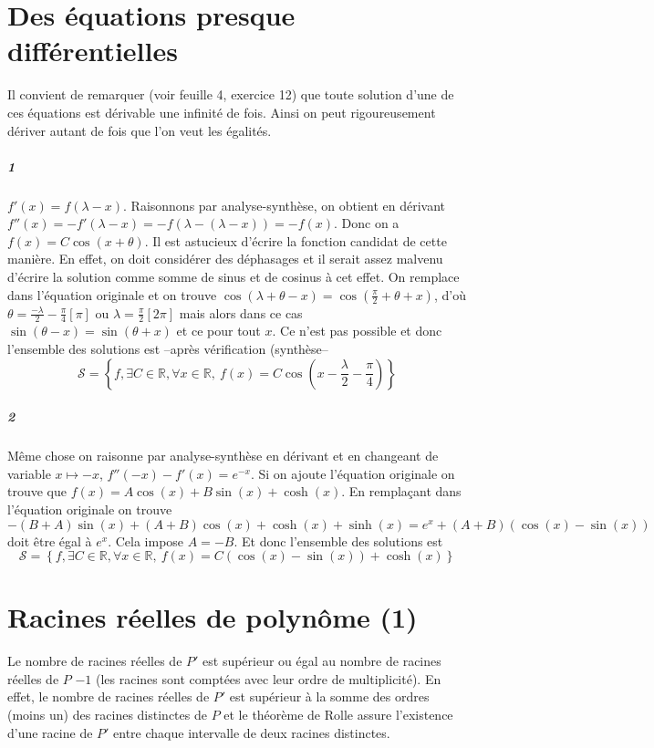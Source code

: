 \documentclass[10pt,a4paper]{article}
\begin{document}
\section{Des équations presque différentielles}
Il convient de remarquer (voir feuille 4, exercice 12) que toute solution d'une de ces équations est dérivable une infinité de fois. Ainsi on peut rigoureusement dériver autant de fois que l'on veut les égalités.
\subparagraph{1} $f'(x) = f(\lambda -x)$. Raisonnons par analyse-synthèse, on obtient en dérivant $f''(x) = -f'(\lambda-x) = -f(\lambda - (\lambda -x)) = -f(x)$. Donc on a $f(x) = C\cos(x+\theta)$. Il est astucieux d'écrire la fonction candidat de cette manière. En effet, on doit considérer des déphasages et il serait assez malvenu d'écrire la solution comme somme de sinus et de cosinus à cet effet. On remplace dans l'équation originale et on trouve $\cos(\lambda + \theta -x) = \cos(\frac{\pi}{2} + \theta + x)$, d'où $\theta = \frac{-\lambda}{2} - \frac{\pi}{4}[\pi]$ ou $\lambda = \frac{\pi}{2}[2\pi]$ mais alors dans ce cas $\sin(\theta -x) = \sin(\theta + x)$ et ce pour tout $x$. Ce n'est pas possible et donc l'ensemble des solutions est --après vérification (synthèse--
\[
\mathcal{S} = \left\lbrace f, \exists C \in \mathbb{R}, \forall x \in \mathbb{R}, \ f(x) = C\cos(x -\frac{\lambda}{2} - \frac{\pi}{4})\right\rbrace
\] 
\subparagraph{2}Même chose on raisonne par analyse-synthèse en dérivant et en changeant de variable $x \mapsto -x$, $f''(-x) - f'(x) = e^{-x}$. Si on ajoute l'équation originale on trouve que $f(x) = A\cos(x) + B\sin(x) + \cosh(x)$. En remplaçant dans l'équation originale on trouve $-(B+A) \sin(x) + (A+B)\cos(x) + \cosh(x) + \sinh(x) = e^x + (A+B) (\cos(x) - \sin(x))$ doit être égal à $e^x$. Cela impose $A = -B$. Et donc l'ensemble des solutions est
\[
\mathcal{S} = \left\lbrace f, \exists C \in \mathbb{R}, \forall x \in \mathbb{R}, \ f(x) = C(\cos(x) - \sin(x)) + \cosh(x) \right\rbrace
\] 
\section{Racines réelles de polynôme (1)}
Le nombre de racines réelles de $P'$ est supérieur ou égal au nombre de racines réelles de $P$ $-1$ (les racines sont comptées avec leur ordre de multiplicité). En effet, le nombre de racines réelles de $P'$ est supérieur à la somme des ordres (moins un) des racines distinctes de $P$ et le théorème de Rolle assure l'existence d'une racine de $P'$ entre chaque intervalle de deux racines distinctes.
\end{document}
